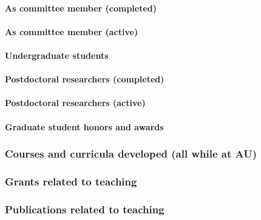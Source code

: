 

\paragraph*{As committee member (completed)}



\paragraph*{As committee member (active)}



\paragraph*{Undergraduate students}



\paragraph*{Postdoctoral researchers (completed)}



\paragraph*{Postdoctoral researchers (active)}



\paragraph*{Graduate student honors and awards}



\subsubsection{Courses and curricula developed (all while at AU)}


\subsubsection{Grants related to teaching}


\subsubsection{Publications related to teaching}

